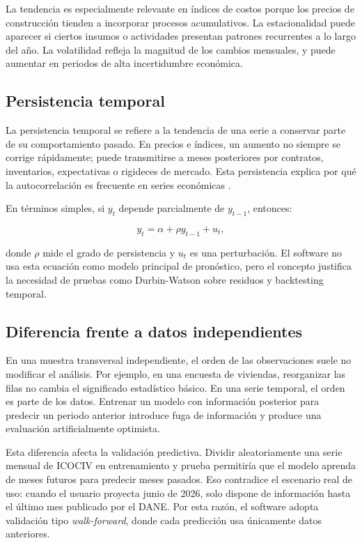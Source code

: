 La tendencia es especialmente relevante en índices de costos porque los precios de construcción tienden a incorporar procesos acumulativos. La estacionalidad puede aparecer si ciertos insumos o actividades presentan patrones recurrentes a lo largo del año. La volatilidad refleja la magnitud de los cambios mensuales, y puede aumentar en periodos de alta incertidumbre económica.

\subsection{Persistencia temporal}

La persistencia temporal se refiere a la tendencia de una serie a conservar parte de su comportamiento pasado. En precios e índices, un aumento no siempre se corrige rápidamente; puede transmitirse a meses posteriores por contratos, inventarios, expectativas o rigideces de mercado. Esta persistencia explica por qué la autocorrelación es frecuente en series económicas \parencite{hyndman2021fpp3}.

En términos simples, si \(y_t\) depende parcialmente de \(y_{t-1}\), entonces:

\begin{equation}
    y_t = \alpha + \rho y_{t-1} + u_t,
    \label{eq:persistencia}
\end{equation}

donde \(\rho\) mide el grado de persistencia y \(u_t\) es una perturbación. El software no usa esta ecuación como modelo principal de pronóstico, pero el concepto justifica la necesidad de pruebas como Durbin-Watson sobre residuos y backtesting temporal.

\subsection{Diferencia frente a datos independientes}

En una muestra transversal independiente, el orden de las observaciones suele no modificar el análisis. Por ejemplo, en una encuesta de viviendas, reorganizar las filas no cambia el significado estadístico básico. En una serie temporal, el orden es parte de los datos. Entrenar un modelo con información posterior para predecir un periodo anterior introduce fuga de información y produce una evaluación artificialmente optimista.

Esta diferencia afecta la validación predictiva. Dividir aleatoriamente una serie mensual de ICOCIV en entrenamiento y prueba permitiría que el modelo aprenda de meses futuros para predecir meses pasados. Eso contradice el escenario real de uso: cuando el usuario proyecta junio de 2026, solo dispone de información hasta el último mes publicado por el DANE. Por esta razón, el software adopta validación tipo \textit{walk-forward}, donde cada predicción usa únicamente datos anteriores.

